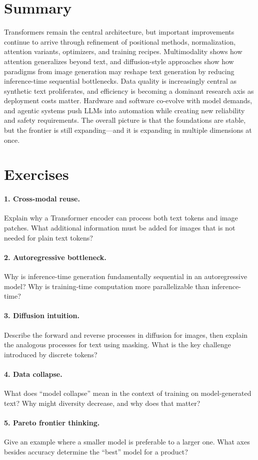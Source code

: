 \section{Summary}
Transformers remain the central architecture, but important improvements continue to arrive through refinement of positional methods, normalization, attention variants, optimizers, and training recipes. Multimodality shows how attention generalizes beyond text, and diffusion-style approaches show how paradigms from image generation may reshape text generation by reducing inference-time sequential bottlenecks. Data quality is increasingly central as synthetic text proliferates, and efficiency is becoming a dominant research axis as deployment costs matter. Hardware and software co-evolve with model demands, and agentic systems push LLMs into automation while creating new reliability and safety requirements. The overall picture is that the foundations are stable, but the frontier is still expanding—and it is expanding in multiple dimensions at once.

\section{Exercises}
\paragraph{1. Cross-modal reuse.}
Explain why a Transformer encoder can process both text tokens and image patches. What additional information must be added for images that is not needed for plain text tokens?

\paragraph{2. Autoregressive bottleneck.}
Why is inference-time generation fundamentally sequential in an autoregressive model? Why is training-time computation more parallelizable than inference-time?

\paragraph{3. Diffusion intuition.}
Describe the forward and reverse processes in diffusion for images, then explain the analogous processes for text using masking. What is the key challenge introduced by discrete tokens?

\paragraph{4. Data collapse.}
What does “model collapse” mean in the context of training on model-generated text? Why might diversity decrease, and why does that matter?

\paragraph{5. Pareto frontier thinking.}
Give an example where a smaller model is preferable to a larger one. What axes besides accuracy determine the “best” model for a product?
